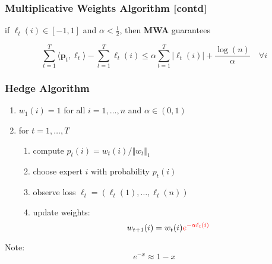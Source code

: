 \documentclass{beamer}
\begin{document}
\begin{frame}
  \frametitle{Multiplicative Weights Algorithm [contd]}

  \begin{theorem}
    if $\ell_t(i) \in [-1, 1]$ and $\alpha < \frac12$, then \textbf{MWA} guarantees

    \begin{equation}
      \sum_{t=1}^{T} \langle \bm{p}_t, \bm{\ell}_t \rangle  - \sum_{t=1}^{T} \ell_t(i) \le \alpha \sum_{t=1}^{T} \vert \ell_t(i) \vert + \frac{\log(n)}{\alpha} \quad \forall i
    \end{equation}

  \end{theorem}

\end{frame}


\begin{frame}
  \frametitle{Hedge Algorithm}
  \begin{enumerate}
    \item $w_1(i) = 1$ for all $i = 1, \dots, n$ and $\alpha \in (0, 1)$
    \item for $t=1, \dots, T$
      \begin{enumerate}
        \item compute $p_t(i) = w_t(i)/\Vert w_t \Vert_1$
        \item choose expert $i$ with probability $p_t(i)$
        \item observe loss $\bm{\ell}_t= (\ell_t(1), \dots, \ell_t(n))$
        \item update weights:
          \begin{equation}
            w_{t+1}(i) =  w_t(i) \textcolor{red}{e^{-\alpha \ell_t(i)}}
          \end{equation}
      \end{enumerate}
  \end{enumerate}
  \vfill
  Note:
  \begin{equation}
    e^{-x} \approx 1-x
  \end{equation}

\end{frame}
\end{document}
